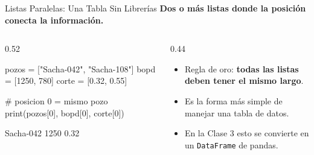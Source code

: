 \documentclass[aspectratio=169, 11pt]{beamer}
\begin{document}
\begin{frame}[fragile,shrink=18]{Listas Paralelas: Una Tabla Sin Librerías}
  \vspace{-4pt}
  {\small\color{arcaDark}\bfseries
    Dos o más listas donde la \textbf{posición} conecta la información.}

  \vspace{5pt}
  \begin{columns}[T]
    \begin{column}{0.52\textwidth}
      \begin{pyblock}
pozos = ["Sacha-042", "Sacha-108"]
bopd  = [1250, 780]
corte = [0.32, 0.55]

# posicion 0 = mismo pozo
print(pozos[0], bopd[0], corte[0])
      \end{pyblock}
      \vspace{2pt}
      \begin{outputblock}
Sacha-042 1250 0.32
      \end{outputblock}
    \end{column}

    \begin{column}{0.44\textwidth}
      {\scriptsize\color{textMuted}
      \begin{itemize}\setlength{\itemsep}{5pt}
        \item[{\color{arcaRed}\scriptsize\faArrowRight}]
          Regla de oro: \textbf{todas las listas
          deben tener el mismo largo}.
        \item[{\color{arcaRed}\scriptsize\faArrowRight}]
          Es la forma más simple de manejar
          una tabla de datos.
        \item[{\color{codeGreen}\scriptsize\faCheck}]
          En la Clase 3 esto se convierte
          en un \texttt{DataFrame} de pandas.
      \end{itemize}
      }
    \end{column}
  \end{columns}
\end{frame}
\end{document}
